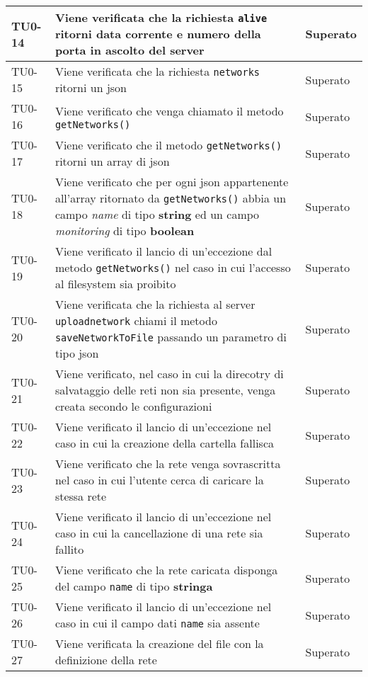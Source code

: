 \begin{longtable}{|C{.15\textwidth}|m{.65\textwidth}|C{.20\textwidth}|}
\hline
 TU0-14 & Viene verificata che la richiesta \texttt{alive} ritorni data corrente e numero della porta in ascolto del server & Superato \\ 
\hline 
{}TU0-15 & Viene verificata che la richiesta \texttt{networks} ritorni un json & Superato \\ 
\hline 
 TU0-16 & Viene verificato che venga chiamato il metodo \texttt{getNetworks()} & Superato \\
\hline 
{}TU0-17 & Viene verificato che il metodo \texttt{getNetworks()} ritorni un array di json & Superato \\ 
\hline
TU0-18 & Viene verificato che per ogni json appartenente all'array ritornato da \texttt{getNetworks()} abbia un campo \textit{name} di tipo \textbf{string} ed un campo \textit{monitoring} di tipo \textbf{boolean} & Superato \\ 
\hline
{}TU0-19 & Viene verificato il lancio di un'eccezione dal metodo \texttt{getNetworks()} nel caso in cui l'accesso al filesystem sia proibito & Superato \\ 
\hline 
TU0-20 & Viene verificata che la richiesta al server \texttt{uploadnetwork} chiami il metodo \texttt{saveNetworkToFile} passando un parametro di tipo json & Superato \\ 
\hline 
{}TU0-21 & Viene verificato, nel caso in cui la direcotry di salvataggio delle reti non sia presente, venga creata secondo le configurazioni & Superato \\ 
\hline 
 TU0-22 & Viene verificato il lancio di un'eccezione nel caso in cui la creazione della cartella fallisca & Superato \\ 
\hline 
{}TU0-23 & Viene verificato che la rete venga sovrascritta nel caso in cui l'utente cerca di caricare la stessa rete & Superato \\
\hline
 TU0-24 & Viene verificato il lancio di un'eccezione nel caso in cui la cancellazione di una rete sia fallito & Superato \\ 
\hline
{}TU0-25 & Viene verificato che la rete caricata disponga del campo \texttt{name} di tipo \textbf{stringa} & Superato \\ 
\hline 
 TU0-26 & Viene verificato il lancio di un'eccezione nel caso in cui il campo dati \texttt{name} sia assente & Superato \\ 
\hline 
{}TU0-27	 & Viene verificata la creazione del file con la definizione della rete & Superato \\ 

\end{longtable}
